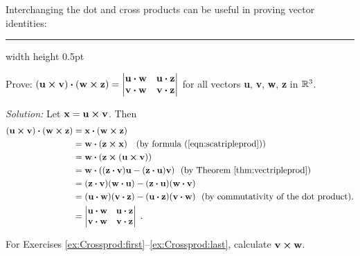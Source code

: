Interchanging the dot and cross products can be useful in proving vector identities:

\medskip
\hrule width \textwidth height 0.5pt
\begin{exmp}\label{exmp:quadcrossdot}
 Prove: $(\textbf{u} \bm{\times} \textbf{v}) \bm{\cdot} (\textbf{w} \bm{\times} \textbf{z}) =
 \begin{vmatrix}
   \textbf{u} \bm{\cdot} \textbf{w} & \textbf{u} \bm{\cdot} \textbf{z}\\
   \textbf{v} \bm{\cdot} \textbf{w} & \textbf{v} \bm{\cdot} \textbf{z}\end{vmatrix}$ for all vectors \textbf{u},
   \textbf{v}, \textbf{w}, \textbf{z} in $\mathbb{R}^{3}$.
   \smallskip
 \par\noindent\emph{Solution:} Let $\textbf{x} = \textbf{u} \bm{\times} \textbf{v}$. Then
 \begin{align*}
  (\textbf{u} \bm{\times} \textbf{v}) \bm{\cdot} (\textbf{w} \bm{\times} \textbf{z}) &=
   \textbf{x} \bm{\cdot} (\textbf{w} \bm{\times} \textbf{z})\\
  &= \textbf{w} \bm{\cdot} (\textbf{z} \bm{\times} \textbf{x}) \text{~~~(by formula (\ref{eqn:scatripleprod}))}\\
  &= \textbf{w} \bm{\cdot} (\textbf{z} \bm{\times} (\textbf{u} \bm{\times} \textbf{v}))\\
  &= \textbf{w} \bm{\cdot} ((\textbf{z} \bm{\cdot} \textbf{v})\textbf{u} -
   (\textbf{z} \bm{\cdot} \textbf{u})\textbf{v}) \text{~~(by Theorem \ref{thm:vectripleprod})}\\
  &= (\textbf{z} \bm{\cdot} \textbf{v})(\textbf{w} \bm{\cdot} \textbf{u}) -
  (\textbf{z} \bm{\cdot} \textbf{u})(\textbf{w} \bm{\cdot} \textbf{v})\\
  &= (\textbf{u} \bm{\cdot} \textbf{w})(\textbf{v} \bm{\cdot} \textbf{z}) -
  (\textbf{u} \bm{\cdot} \textbf{z})(\textbf{v} \bm{\cdot} \textbf{w}) \text{~~(by commutativity of the dot product).}\\
  &= \begin{vmatrix}
   \textbf{u} \bm{\cdot} \textbf{w} & \textbf{u} \bm{\cdot} \textbf{z}\\
   \textbf{v} \bm{\cdot} \textbf{w} & \textbf{v} \bm{\cdot} \textbf{z}\end{vmatrix}~.
 \end{align*}
\end{exmp}
\startexercises\label{sec1dot4}
\par\noindent For Exercises \ref{ex:Crossprod:first}--\ref{ex:Crossprod:last}, calculate $\textbf{v} \bm{\times} \textbf{w}$.
